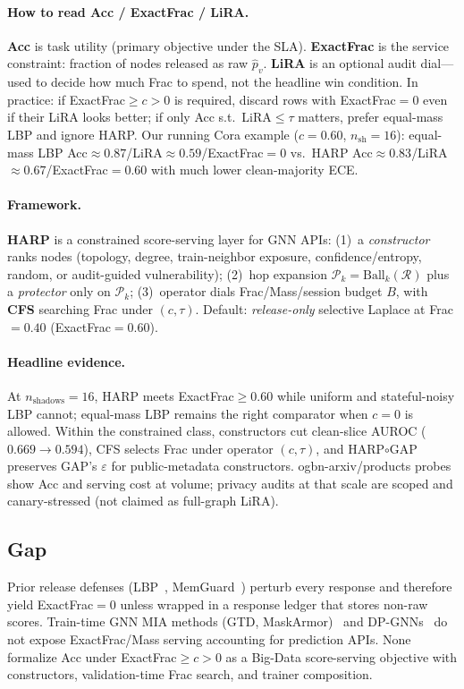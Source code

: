 \documentclass[conference]{IEEEtran}
\begin{document}
\paragraph{How to read Acc / ExactFrac / LiRA.}
\textbf{Acc} is task utility (primary objective under the SLA).
\textbf{ExactFrac} is the service constraint: fraction of nodes released as raw $\hat p_v$.
\textbf{LiRA} is an optional audit dial---used to decide how much Frac to spend, not the headline win condition.
In practice: if ExactFrac$\ge c{>}0$ is required, discard rows with ExactFrac${=}0$ even if their LiRA looks better; if only Acc s.t.\ LiRA$\le\tau$ matters, prefer equal-mass LBP and ignore HARP.
Our running Cora example ($c{=}0.60$, $n_{\mathrm{sh}}{=}16$): equal-mass LBP Acc${\approx}0.87$/LiRA${\approx}0.59$/ExactFrac${=}0$ vs.\ HARP Acc${\approx}0.83$/LiRA${\approx}0.67$/ExactFrac${=}0.60$ with much lower clean-majority ECE.

\paragraph{Framework.}
\textbf{HARP} is a constrained score-serving layer for GNN APIs:
(1)~a \emph{constructor} ranks nodes (topology, degree, train-neighbor exposure, confidence/entropy, random, or audit-guided vulnerability);
(2)~hop expansion $\mathcal{P}_k=\mathrm{Ball}_k(\mathcal{R})$ plus a \emph{protector} only on $\mathcal{P}_k$;
(3)~operator dials Frac/Mass/session budget $B$, with \textbf{CFS} searching Frac under $(c,\tau)$.
Default: \emph{release-only} selective Laplace at Frac${=}0.40$ (ExactFrac${=}0.60$).

\paragraph{Headline evidence.}
At $n_{\mathrm{shadows}}{=}16$, HARP meets ExactFrac$\ge 0.60$ while uniform and stateful-noisy LBP cannot; equal-mass LBP remains the right comparator when $c{=}0$ is allowed.
Within the constrained class, constructors cut clean-slice AUROC ($0.669\rightarrow 0.594$), CFS selects Frac under operator $(c,\tau)$, and HARP$\circ$GAP preserves GAP's $\varepsilon$ for public-metadata constructors.
ogbn-arxiv/products probes show Acc and serving cost at volume; privacy audits at that scale are scoped and canary-stressed (not claimed as full-graph LiRA).

\subsection{Gap}
Prior release defenses (LBP~\cite{olatunji2021mia}, MemGuard~\cite{jia2019memguard}) perturb every response and therefore yield ExactFrac${=}0$ unless wrapped in a response ledger that stores non-raw scores.
Train-time GNN MIA methods (GTD, MaskArmor)~\cite{gtd2024,maskarmor2024} and DP-GNNs~\cite{sajadmanesh2023gap,napgnn2023,abadi2016deepdp} do not expose ExactFrac/Mass serving accounting for prediction APIs.
None formalize Acc under ExactFrac$\ge c{>}0$ as a Big-Data score-serving objective with constructors, validation-time Frac search, and trainer composition.
\end{document}
